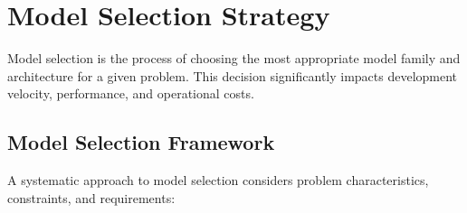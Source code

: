 \section{Model Selection Strategy}

Model selection is the process of choosing the most appropriate model family and architecture for a given problem. This decision significantly impacts development velocity, performance, and operational costs.

\subsection{Model Selection Framework}

A systematic approach to model selection considers problem characteristics, constraints, and requirements:

